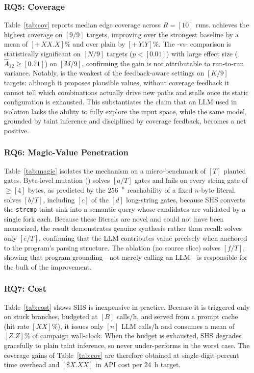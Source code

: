 \subsubsection{RQ5: Coverage}
Table~\ref{tab:cov} reports median edge coverage across $R=[10]$ runs. \KSHS{} achieves the highest coverage on $[9/9]$ targets, improving over the strongest baseline by a mean of $[+\,XX.X]\%$ and over plain \KOFTA{} by $[+\,Y.Y]\%$. The \KSHS{}-vs-\KOFTA{} comparison is statistically significant on $[N/9]$ targets ($p<[0.01]$) with large effect size ($\hat{A}_{12}\geq[0.71]$) on $[M/9]$, confirming the gain is not attributable to run-to-run variance. Notably, \LLMonly{} is the weakest of the feedback-aware settings on $[K/9]$ targets: although it proposes plausible values, without coverage feedback it cannot tell which combinations actually drive new paths and stalls once its static configuration is exhausted. This substantiates the claim that an LLM used in isolation lacks the ability to fully explore the input space, while the same model, grounded by taint inference and disciplined by coverage feedback, becomes a net positive.

\subsubsection{RQ6: Magic-Value Penetration}
Table~\ref{tab:magic} isolates the mechanism on a micro-benchmark of $[T]$ planted gates. Byte-level mutation (\KOFTA{}) solves $[a/T]$ gates and fails on every string gate of $\geq[4]$ bytes, as predicted by the $256^{-n}$ reachability of a fixed $n$-byte literal. \KSHS{} solves $[b/T]$, including $[c]$ of the $[d]$ long-string gates, because SHS converts the \texttt{strcmp} taint sink into a semantic query whose candidates are validated by a single fork each. Because these literals are novel and could not have been memorized, the result demonstrates genuine synthesis rather than recall: \LLMonly{} solves only $[e/T]$, confirming that the LLM contributes value precisely when anchored to the program's parsing structure. The ablation \KSHSng{} (no source slice) solves $[f/T]$, showing that program grounding---not merely calling an LLM---is responsible for the bulk of the improvement.

\subsubsection{RQ7: Cost}
Table~\ref{tab:cost} shows SHS is inexpensive in practice. Because it is triggered only on stuck branches, budgeted at $[B]$ calls/h, and served from a prompt cache (hit rate $[XX]\%$), it issues only $[n]$ LLM calls/h and consumes a mean of $[Z.Z]\%$ of campaign wall-clock. When the budget is exhausted, SHS degrades gracefully to plain taint inference, so \KSHS{} never under-performs \KOFTA{} in the worst case. The coverage gains of Table~\ref{tab:cov} are therefore obtained at single-digit-percent time overhead and $[\$X.XX]$ in API cost per 24~h target.

